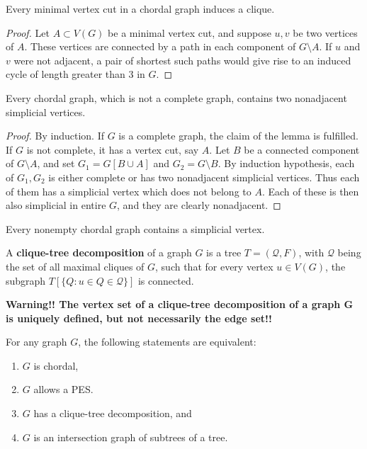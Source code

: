 \begin{lemma}
	Every minimal vertex cut in a chordal graph induces a clique.
\end{lemma}

\begin{proof}
	Let $A \subset V(G)$ be a minimal vertex cut, and suppose $u, v$ be two vertices of $A$. These vertices	are connected by a path in each component of $G \setminus A$. If $u$ and $v$ were not adjacent, a pair of shortest such paths would give rise to an induced cycle of length greater than 3 in $G$.
\end{proof}

\begin{lemma}
	Every chordal graph, which is not a complete graph, contains two nonadjacent simplicial vertices.
\end{lemma}

\begin{proof}
	By induction. If $G$ is a complete graph, the claim of the lemma is fulfilled. If $G$ is not complete, it has a vertex cut, say $A$. Let $B$ be a connected component of $G \setminus A$, and set $G_1 = G[B \cup A]$ and $G_2 = G \setminus B$. By induction hypothesis, each of $G_1, G_2$ is either complete or has two nonadjacent simplicial vertices. Thus each of them has a simplicial vertex which does not belong to $A$. Each of	these is then also simplicial in entire $G$, and they are clearly nonadjacent.
\end{proof}

\begin{cor}
	Every nonempty chordal graph contains a simplicial vertex.
\end{cor}

\begin{defn}
	A \textbf{clique-tree decomposition} of a graph $G$ is a tree $T = (\mathcal{Q}, F)$, with $\mathcal{Q}$ being the set of all maximal cliques of $G$, such that for every vertex $u \in V(G)$, the subgraph $T[\{Q : u \in Q \in \mathcal{Q}\}]$ is connected.
\end{defn}

\textbf{Warning!! The vertex set of a clique-tree decomposition of a graph G is uniquely defined, but not necessarily the edge set!!}

\begin{thm}
	For any graph $G$, the following statements are equivalent:
	
	\begin{enumerate}
		\item $G$ is chordal,
		\item $G$ allows a PES.
		\item $G$ has a clique-tree decomposition, and
		\item $G$ is an intersection graph of subtrees of a tree.
	\end{enumerate}
\end{thm}

